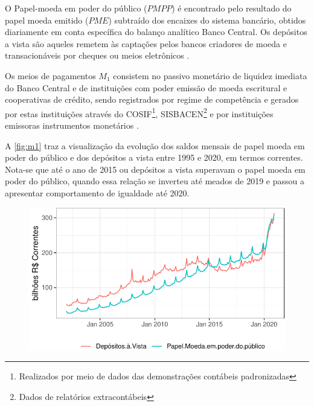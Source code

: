 \documentclass[12pt,12pt,openright,oneside,a4paper,chapter=TITLE,section=TITLE,subsection=TITLE,subsubsection=TITLE,english,french,spanish,portugues,sumario=tradicional]{abntex2}
\begin{document}
O Papel-moeda em poder do público (\(PMPP\)) é encontrado pelo resultado do papel moeda emitido (\(PME\)) subtraído dos encaixes do sistema bancário, obtidos diariamente em conta específica do balanço analítico Banco Central. Os depósitos a vista são aqueles remetem às captações pelos bancos criadores de moeda e transacionáveis por cheques ou meios eletrônicos \cite{sgs:m1}.

Os meios de pagamentos \(M_1\) consistem no passivo monetário de liquidez imediata do Banco Central e de instituições com poder emissão de moeda escritural e cooperativas de crédito, sendo registrados por regime de competência e gerados por estas instituições através do COSIF\footnote{ Realizados por meio de dados das demonstrações contábeis padronizadas}, SISBACEN\footnote{Dados de relatórios extracontábeis} e por instituições emissoras instrumentos monetários \cite{sgs:m1} \cite{sgs:mpa}.

A \autoref{fig:m1} traz a visualização da evolução dos saldos mensais de papel moeda em poder do público e dos depósitos a vista entre 1995 e 2020, em termos correntes. Nota-se que até o ano de 2015 ou depósitos a vista superavam o papel moeda em poder do público, quando essa relação se inverteu até meados de 2019 e passou a apresentar comportamento de igualdade até 2020.

\begin{figure}

\begin{center}\includegraphics{12-exportedfigures/m1-1} \end{center}
\label{fig:m1}
\end{figure}
\end{document}
